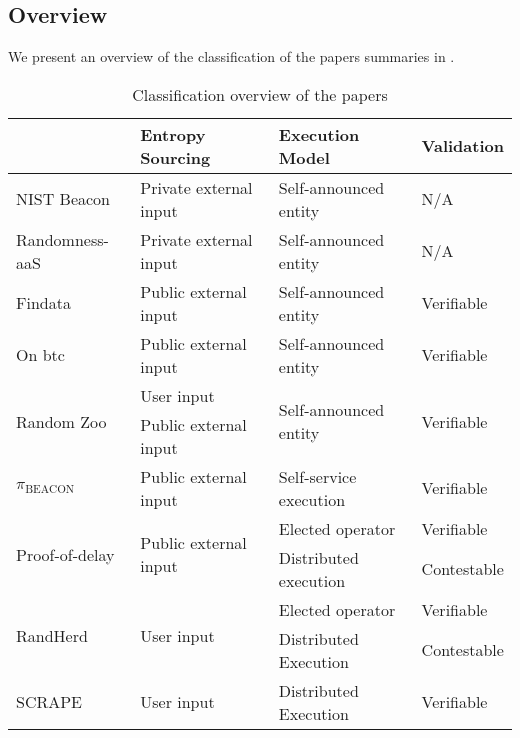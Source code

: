 \subsection{Overview}\label{sub:overview}
We present an overview of the classification of the papers summaries in .

\begin{table}[htbp]
    \centering
    \begin{tabularx}{\textwidth}{Xlll}
                               & \textbf{Entropy Sourcing}              & \textbf{Execution Model}               & \textbf{Validation}         \\\midrule
NIST Beacon                    & Private external input                 & Self-announced entity                  & N/A                         \\[1.5em]
Randomness-aaS                 & Private external input                 & Self-announced entity                  & N/A                         \\[1.5em]
Findata                        & Public external input                  & Self-announced entity                  & Verifiable                  \\[1.5em]
On btc                         & Public external input                  & Self-announced entity                  & Verifiable                  \\[1.5em]
\multirow{2}{*}{Random Zoo}    & User input                             & \multirow{2}{*}{Self-announced entity} & \multirow{2}{*}{Verifiable} \\
                               & Public external input                  &                                        &                             \\[1.5em]
$\pi_\text{BEACON}$            & Public external input                  & Self-service execution                 & Verifiable                  \\[1.5em]
\multirow{2}{*}{Proof-of-delay}& \multirow{2}{*}{Public external input} & Elected operator                       & Verifiable                  \\
                               &                                        & Distributed execution                  & Contestable                 \\[1.5em]
\multirow{2}{*}{RandHerd}      & \multirow{2}{*}{User input}            & Elected operator                       & Verifiable                  \\
                               &                                        & Distributed Execution                  & Contestable                 \\[1.5em]
SCRAPE                         & User input                             & Distributed Execution                  & Verifiable                  \\\bottomrule
    \end{tabularx}
    \caption{Classification overview of the papers}\label{tab:paper_overview}
\end{table}

